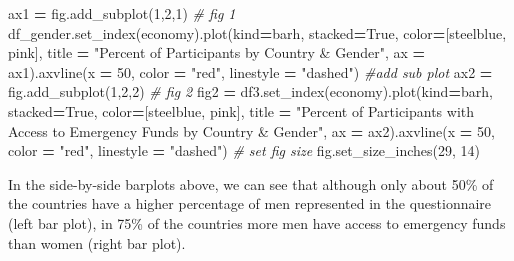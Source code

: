 \documentclass[water,article,submit,moreauthors,pdftex]{mdpi}
\newenvironment{Shaded}{\begin{snugshade}}{\end{snugshade}}
\newcommand{\CommentTok}[1]{\textcolor[rgb]{0.56,0.35,0.01}{\textit{#1}}}
\newcommand{\DecValTok}[1]{\textcolor[rgb]{0.00,0.00,0.81}{#1}}
\newcommand{\NormalTok}[1]{#1}
\newcommand{\OperatorTok}[1]{\textcolor[rgb]{0.81,0.36,0.00}{\textbf{#1}}}
\newcommand{\StringTok}[1]{\textcolor[rgb]{0.31,0.60,0.02}{#1}}
\newcommand{\VariableTok}[1]{\textcolor[rgb]{0.00,0.00,0.00}{#1}}
\begin{document}
\begin{Shaded}
\begin{Highlighting}[]
\NormalTok{ax1 }\OperatorTok{=}\NormalTok{ fig.add\_subplot(}\DecValTok{1}\NormalTok{,}\DecValTok{2}\NormalTok{,}\DecValTok{1}\NormalTok{)}
\CommentTok{\# fig 1}
\NormalTok{df\_gender.set\_index(}\StringTok{\textquotesingle{}economy\textquotesingle{}}\NormalTok{).plot(kind}\OperatorTok{=}\StringTok{\textquotesingle{}barh\textquotesingle{}}\NormalTok{, stacked}\OperatorTok{=}\VariableTok{True}\NormalTok{, color}\OperatorTok{=}\NormalTok{[}\StringTok{\textquotesingle{}steelblue\textquotesingle{}}\NormalTok{, }\StringTok{\textquotesingle{}pink\textquotesingle{}}\NormalTok{], title }\OperatorTok{=} \StringTok{"Percent of Participants by Country \& Gender"}\NormalTok{, ax }\OperatorTok{=}\NormalTok{ ax1).axvline(x }\OperatorTok{=} \DecValTok{50}\NormalTok{, color }\OperatorTok{=} \StringTok{"red"}\NormalTok{, linestyle }\OperatorTok{=} \StringTok{"dashed"}\NormalTok{)}
\CommentTok{\#add sub plot}
\NormalTok{ax2 }\OperatorTok{=}\NormalTok{ fig.add\_subplot(}\DecValTok{1}\NormalTok{,}\DecValTok{2}\NormalTok{,}\DecValTok{2}\NormalTok{)}
\CommentTok{\# fig 2}
\NormalTok{fig2 }\OperatorTok{=}\NormalTok{ df3.set\_index(}\StringTok{\textquotesingle{}economy\textquotesingle{}}\NormalTok{).plot(kind}\OperatorTok{=}\StringTok{\textquotesingle{}barh\textquotesingle{}}\NormalTok{, stacked}\OperatorTok{=}\VariableTok{True}\NormalTok{, color}\OperatorTok{=}\NormalTok{[}\StringTok{\textquotesingle{}steelblue\textquotesingle{}}\NormalTok{, }\StringTok{\textquotesingle{}pink\textquotesingle{}}\NormalTok{], title }\OperatorTok{=} \StringTok{"Percent of Participants with Access to Emergency Funds by Country \& Gender"}\NormalTok{, ax }\OperatorTok{=}\NormalTok{ ax2).axvline(x }\OperatorTok{=} \DecValTok{50}\NormalTok{, color }\OperatorTok{=} \StringTok{"red"}\NormalTok{, linestyle }\OperatorTok{=} \StringTok{"dashed"}\NormalTok{)}
\CommentTok{\# set fig size}
\NormalTok{fig.set\_size\_inches(}\DecValTok{29}\NormalTok{, }\DecValTok{14}\NormalTok{)}
\end{Highlighting}
\end{Shaded}

In the side-by-side barplots above, we can see that although only about
50\% of the countries have a higher percentage of men represented in the
questionnaire (left bar plot), in 75\% of the countries more men have
access to emergency funds than women (right bar plot).
\end{document}

